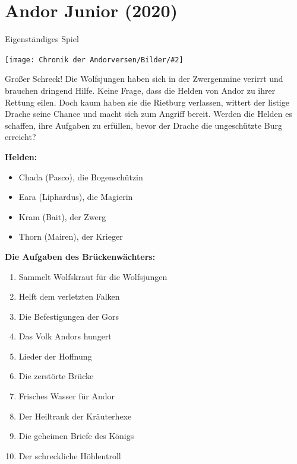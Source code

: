 \documentclass[10pt, a4paper, oneside]{book}
\newcommand{\fillbreak}{\vspace*{\fill}\columnbreak}
\newcommand{\produkt}[1]{%
    \section{#1}%
    \label{Produkt: #1}%
}
\newcommand{\bildmitts}[2][height=0.32\textwidth,width=0.48\textwidth,keepaspectratio]{%
    \begin{center}
        \texttt{[image: Chronik der Andorversen/Bilder/\#2]}
    \end{center}
}
\begin{document}
\begin{multicols}{2}
\begin{chapterbox}
\end{chapterbox}



\fillbreak
\produkt{Andor Junior (2020)}

\begin{center}
    Eigenständiges Spiel
\end{center}


\bildmitts{Andor Junior (2020).png}

Großer Schreck! Die Wolfsjungen haben sich in der Zwergenmine verirrt und brauchen dringend Hilfe. Keine Frage, dass die Helden von Andor zu ihrer Rettung eilen. Doch kaum haben sie die Rietburg verlassen, wittert der listige Drache seine Chance und macht sich zum Angriff bereit. Werden die Helden es schaffen, ihre Aufgaben zu erfüllen, bevor der Drache die ungeschützte Burg erreicht?\bigskip

\textbf{Helden:}

\begin{itemize}[topsep=0pt,itemsep=-1ex,partopsep=1ex,parsep=1ex]
    \item Chada (Pasco), die Bogenschützin 
    \item Eara (Liphardus), die Magierin 
    \item Kram (Bait), der Zwerg 
    \item Thorn (Mairen), der Krieger 
\end{itemize}


\textbf{Die Aufgaben des Brückenwächters:}

\begin{enumerate}[topsep=0pt,itemsep=-1ex,partopsep=1ex,parsep=1ex]
    \setcounter{enumi}{0}
    \item Sammelt Wolfskraut für die Wolfsjungen
    \item Helft dem verletzten Falken
    \item Die Befestigungen der Gors
    \item Das Volk Andors hungert
    \item Lieder der Hoffnung
    \item Die zerstörte Brücke
    \item Frisches Wasser für Andor
    \item Der Heiltrank der Kräuterhexe
    \item Die geheimen Briefe des Königs
    \item Der schreckliche Höhlentroll
\end{enumerate}




\end{multicols}
\end{document}
